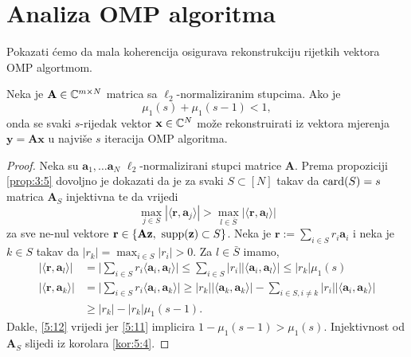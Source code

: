 \documentclass[a4paper,twoside,12pt]{memoir} %
\newcommand{\vect}[1]{\mathbf{#1}}
\renewcommand{\vec}{\vect}
\newcommand{\card}{\text{\normalfont{card}}}
\newcommand{\supp}{\text{\normalfont{supp}}}
\begin{document}
\section[Analiza OMP algoritma][Analiza OMP algoritma]{Analiza OMP algoritma}
Pokazati \'cemo da mala koherencija osigurava rekonstrukciju rijetkih vektora OMP algortmom.
\begin{thm}
    Neka je $\vec A \in \C^{m \times N}$ matrica sa $\ell_2$-normaliziranim stupcima. Ako je 
    \begin{equation}\label{5:11}
        \mu_1(s) + \mu_1(s-1) < 1, 
    \end{equation}
    onda se svaki $s$-rijedak vektor $\vec x \in \C^N$ mo\v{z}e rekonstruirati iz vektora mjerenja $\vec y = \vec{Ax}$ u najvi\v{s}e $s$ iteracija OMP algoritma.
\end{thm}
\begin{proof}
    Neka su $\vec a_1, \dots \vec a_N$ $\ell_2$-normalizirani stupci matrice $\vec A$. Prema propoziciji \ref{prop:3:5} dovoljno je dokazati da je za svaki $S \subset [N]$ takav da $\card(S) = s$ matrica $\vec A_S$ injektivna te da vrijedi
    \begin{equation}\label{5:12}
        \max_{j \in S} |\langle \vec r,\vec a_j \rangle|  > \max_{l \in \bar S} |\langle \vec r, \vec a_l \rangle|
    \end{equation}
    za sve ne-nul vektore $\vec r \in \{\vec{Az},\ \supp(\vec z) \subset S\}$. Neka je $\vec r := \sum_{i \in S}r_i \vec a_i$ i neka je $k \in S$ takav da $|r_k| = \max_{i \in S} |r_i| > 0$. Za $l \in \bar S$ imamo,
    \begin{align*}
        |\langle \vec r, \vec a_l \rangle| &= \big | \sum_{i \in S}r_i \langle \vec a_i, \vec a_l \rangle \big | \leq \sum_{i \in S}|r_i||\langle \vec a_i, \vec a_l \rangle| \leq |r_k| \mu_1(s) \\
        |\langle \vec r, \vec a_k \rangle| &= \big | \sum_{i \in S}r_i \langle \vec a_i, \vec a_k \rangle \big |  \geq |r_k| |\langle \vec a_k, \vec a_k \rangle| - \sum_{i \in S, i \neq k}|r_i||\langle \vec a_i, \vec a_k \rangle| \\
        &\geq |r_k| - |r_k|\mu_1(s-1).
    \end{align*}
    Dakle, \eqref{5:12} vrijedi jer \eqref{5:11} implicira $1-\mu_1(s-1) > \mu_1(s)$. Injektivnost od $\vec A_S$ slijedi iz korolara \ref{kor:5:4}.
\end{proof}

\end{document}
